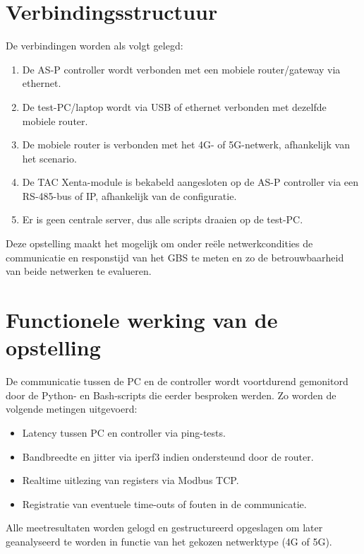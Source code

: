 \section*{Verbindingsstructuur}
De verbindingen worden als volgt gelegd:
\begin{enumerate}
    \item De AS-P controller wordt verbonden met een mobiele router/gateway via ethernet.
    \item De test-PC/laptop wordt via USB of ethernet verbonden met dezelfde mobiele router.
    \item De mobiele router is verbonden met het 4G- of 5G-netwerk, afhankelijk van het scenario.
    \item De TAC Xenta-module is bekabeld aangesloten op de AS-P controller via een RS-485-bus of IP, afhankelijk van de configuratie.
    \item Er is geen centrale server, dus alle scripts draaien op de test-PC.
\end{enumerate}

Deze opstelling maakt het mogelijk om onder reële netwerkcondities de communicatie en responstijd van het GBS te meten en zo de betrouwbaarheid van beide netwerken te evalueren.

\section*{Functionele werking van de opstelling}

De communicatie tussen de PC en de controller wordt voortdurend gemonitord door de Python- en Bash-scripts die eerder besproken werden. Zo worden de volgende metingen uitgevoerd:
\begin{itemize}
    \item Latency tussen PC en controller via ping-tests.
    \item Bandbreedte en jitter via iperf3 indien ondersteund door de router.
    \item Realtime uitlezing van registers via Modbus TCP.
    \item Registratie van eventuele time-outs of fouten in de communicatie.
\end{itemize}

Alle meetresultaten worden gelogd en gestructureerd opgeslagen om later geanalyseerd te worden in functie van het gekozen netwerktype (4G of 5G).

